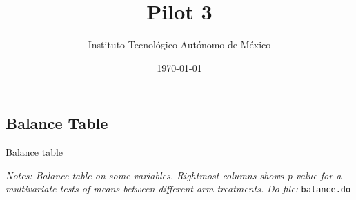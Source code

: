 \documentclass[12pt]{article}
\begin{document}
\title{Pilot 3}

\author{Instituto Tecnológico Autónomo de México}
\date{\today}
\maketitle


\hrulefill


\subsection*{Balance Table}

\begin{table}[H]
\caption{Balance table}
\begin{center}
\scriptsize{}
\end{center}
 \footnotesize
\textit{Notes: Balance table on some variables. Rightmost columns shows p-value for a multivariate tests of means between different arm treatments.} 
\textit{Do file: } \texttt{balance.do}
\end{table}
\end{document}
